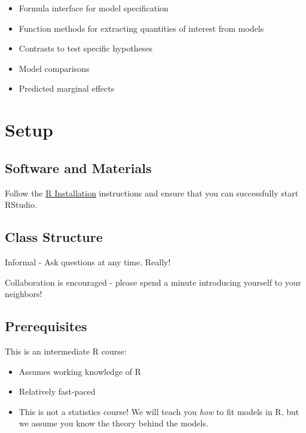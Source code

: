 \documentclass[
]{book}
\providecommand{\tightlist}{%
  \setlength{\itemsep}{0pt}\setlength{\parskip}{0pt}}
\begin{document}
\begin{itemize}
\tightlist
\item
  Formula interface for model specification
\item
  Function methods for extracting quantities of interest from models
\item
  Contrasts to test specific hypotheses
\item
  Model comparisons
\item
  Predicted marginal effects
\end{itemize}

\hypertarget{setup-1}{%
\section{Setup}\label{setup-1}}

\hypertarget{software-and-materials-1}{%
\subsection{Software and Materials}\label{software-and-materials-1}}

Follow the \href{./Rinstall.html}{R Installation} instructions and ensure that you can successfully start RStudio.

\hypertarget{class-structure-1}{%
\subsection{Class Structure}\label{class-structure-1}}

Informal - Ask questions at any time. Really!

Collaboration is encouraged - please spend a minute introducing yourself to your neighbors!

\hypertarget{prerequisites-1}{%
\subsection{Prerequisites}\label{prerequisites-1}}

This is an intermediate R course:

\begin{itemize}
\tightlist
\item
  Assumes working knowledge of R
\item
  Relatively fast-paced
\item
  This is not a statistics course! We will teach you \emph{how} to fit models in R,
  but we assume you know the theory behind the models.
\end{itemize}
\end{document}
